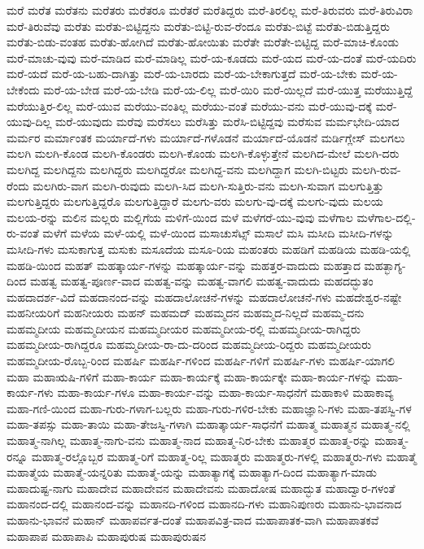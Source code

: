 {ಮರೆ
ಮರೆತ
ಮರೆತನು
ಮರೆತರು
ಮರೆತರೂ
ಮರೆತರೆ
ಮರೆತಿದ್ದರು
ಮರೆ-ತಿರಲಿಲ್ಲ
ಮರೆ-ತಿರುವರು
ಮರೆ-ತಿರುವಿರಾ
ಮರೆ-ತಿರುವೆವು
ಮರೆತು
ಮರೆತು-ಬಿಟ್ಟಿದ್ದನು
ಮರೆತು-ಬಿಟ್ಟಿ-ರುವ-ರೆಂದೂ
ಮರೆತು-ಬಿಟ್ಟೆ
ಮರೆತು-ಬಿಡುತ್ತಿದ್ದರು
ಮರೆತು-ಬಿಡು-ವಂತಹ
ಮರೆತು-ಹೋಗಿದೆ
ಮರೆತು-ಹೋಯಿತು
ಮರೆತೇ
ಮರೆತೇ-ಬಿಟ್ಟಿದ್ದ
ಮರೆ-ಮಾಚಿ-ಕೊಂಡು
ಮರೆ-ಮಾಚು-ವುವು
ಮರೆ-ಮಾಡಿದ
ಮರೆ-ಮಾಡಿಲ್ಲ
ಮರೆ-ಯ-ಕೂಡದು
ಮರೆ-ಯದ
ಮರೆ-ಯ-ದಂತೆ
ಮರೆ-ಯದಿರು
ಮರೆ-ಯದೆ
ಮರೆ-ಯ-ಬಹು-ದಾಗಿತ್ತು
ಮರೆ-ಯ-ಬಾರದು
ಮರೆ-ಯ-ಬೇಕಾಗುತ್ತದೆ
ಮರೆ-ಯ-ಬೇಕು
ಮರೆ-ಯ-ಬೇಕೆಂದು
ಮರೆ-ಯ-ಬೇಡ
ಮರೆ-ಯ-ಬೇಡಿ
ಮರೆ-ಯ-ಲಿಲ್ಲ
ಮರೆ-ಯಿರಿ
ಮರೆ-ಯಿಲ್ಲದೆ
ಮರೆ-ಯುತ್ತ
ಮರೆಯುತ್ತಿದ್ದೆ
ಮರೆಯುತ್ತಿರ-ಲಿಲ್ಲ
ಮರೆ-ಯುವ
ಮರೆಯು-ವಂತಿಲ್ಲ
ಮರೆಯು-ವಂತೆ
ಮರೆಯು-ವನು
ಮರೆ-ಯುವು-ದಕ್ಕೆ
ಮರೆ-ಯುವು-ದಿಲ್ಲ
ಮರೆ-ಯುವುದು
ಮರೆವು
ಮರೆಸಲು
ಮರೆಸಿತ್ತು
ಮರೆಸಿ-ಬಿಟ್ಟಿದ್ದವು
ಮರೆಸುವ
ಮರ್ಮಭೇದಿ-ಯಾದ
ಮರ್ಮರ
ಮರ್ಮಾಂತಕ
ಮರ್ಯಾದೆ-ಗಳು
ಮರ್ಯಾದೆ-ಗಳೊಡನೆ
ಮರ್ಯಾದೆ-ಯೊಡನೆ
ಮರ್ಡಿಗ್ಲೇಸ್
ಮಲಗಲು
ಮಲಗಿ
ಮಲಗಿ-ಕೊಂಡ
ಮಲಗಿ-ಕೊಂಡರು
ಮಲಗಿ-ಕೊಂಡು
ಮಲಗಿ-ಕೊಳ್ಳುತ್ತೇನೆ
ಮಲಗಿದ-ಮೇಲೆ
ಮಲಗಿ-ದರು
ಮಲಗಿದ್ದ
ಮಲಗಿದ್ದನು
ಮಲಗಿದ್ದರು
ಮಲಗಿದ್ದರೋ
ಮಲಗಿದ್ದ-ವನು
ಮಲಗಿದ್ದಾಗ
ಮಲಗಿ-ಬಿಟ್ಟರು
ಮಲಗಿ-ರುವ-ರೆಂದು
ಮಲಗಿರು-ವಾಗ
ಮಲಗಿ-ರುವುದು
ಮಲಗಿ-ಸಿದ
ಮಲಗಿ-ಸುತ್ತಿರು-ವನು
ಮಲಗಿ-ಸುವಾಗ
ಮಲಗುತ್ತಿತ್ತು
ಮಲಗುತ್ತಿದ್ದರು
ಮಲಗುತ್ತಿದ್ದರೊ
ಮಲಗುತ್ತಿದ್ದಾರೆ
ಮಲಗು-ವರು
ಮಲಗು-ವು-ದಕ್ಕೆ
ಮಲಗು-ವುದು
ಮಲಯ
ಮಲಯ-ರನ್ನು
ಮಲಿನ
ಮಲ್ಲರು
ಮಲ್ಲಿಗೆಯ
ಮಳಿಗೆ-ಯಿಂದ
ಮಳೆ
ಮಳೆಗರೆ-ಯು-ವುವು
ಮಳೆಗಾಲ
ಮಳೆಗಾಲ-ದಲ್ಲಿ-ರು-ವಂತೆ
ಮಳೆಗೆ
ಮಳೆಯ
ಮಳೆ-ಯಲ್ಲಿ
ಮಳೆ-ಯಿಂದ
ಮಸಾಚುಸೆಟ್ಸ್
ಮಸಾಲೆ
ಮಸಿ
ಮಸೀದಿ
ಮಸೀದಿ-ಗಳನ್ನು
ಮಸೀದಿ-ಗಳು
ಮಸುಕಾಗುತ್ತ
ಮಸುಕು
ಮಸೂದೆಯ
ಮಸೂ-ರಿಯ
ಮಹಂತರು
ಮಹಡಿಗೆ
ಮಹಡಿಯ
ಮಹಡಿ-ಯಲ್ಲಿ
ಮಹಡಿ-ಯಿಂದ
ಮಹತ್
ಮಹತ್ಕಾರ್ಯ-ಗಳನ್ನು
ಮಹತ್ಕಾರ್ಯ-ವನ್ನು
ಮಹತ್ತರ-ವಾದುದು
ಮಹತ್ತಾದ
ಮಹತ್ಭಾಗ್ಯ-ದಿಂದ
ಮಹತ್ವ
ಮಹತ್ವ-ಪೂರ್ಣ-ವಾದ
ಮಹತ್ವ-ವನ್ನು
ಮಹತ್ವ-ವಾಗಲಿ
ಮಹತ್ವ-ವಾದುದು
ಮಹದದ್ಭುತಂ
ಮಹದಾದರ್ಶ-ವಿದೆ
ಮಹದಾನಂದ-ವನ್ನು
ಮಹದಾಲೋಚನೆ-ಗಳನ್ನು
ಮಹದಾಲೋಚನೆ-ಗಳು
ಮಹದೇಶ್ವರ-ನಷ್ಟೇ
ಮಹನೀಯರಿಗೆ
ಮಹನೀಯರು
ಮಹನ್
ಮಹಮದ್
ಮಹಮ್ಮದನ
ಮಹಮ್ಮದ-ನಿಲ್ಲದೆ
ಮಹಮ್ಮ-ದನು
ಮಹಮ್ಮದೀಯ
ಮಹಮ್ಮದೀಯನ
ಮಹಮ್ಮದೀಯರ
ಮಹಮ್ಮದೀಯ-ರಲ್ಲಿ
ಮಹಮ್ಮದೀಯ-ರಾಗಿದ್ದರು
ಮಹಮ್ಮದೀಯ-ರಾಗಿದ್ದರೂ
ಮಹಮ್ಮದೀಯ-ರಾ-ದು-ದರಿಂದ
ಮಹಮ್ಮದೀಯ-ರಿದ್ದರು
ಮಹಮ್ಮದೀಯರು
ಮಹಮ್ಮದೀಯ-ರೊಬ್ಬ-ರಿಂದ
ಮಹರ್ಷಿ
ಮಹರ್ಷಿ-ಗಳಿಂದ
ಮಹರ್ಷಿ-ಗಳಿಗೆ
ಮಹರ್ಷಿ-ಗಳು
ಮಹರ್ಷಿ-ಯಾಗಲಿ
ಮಹಾ
ಮಹಾಋಷಿ-ಗಳಿಗೆ
ಮಹಾ-ಕಾರ್ಯ
ಮಹಾ-ಕಾರ್ಯಕ್ಕೆ
ಮಹಾ-ಕಾರ್ಯಕ್ಕೇ
ಮಹಾ-ಕಾರ್ಯ-ಗಳನ್ನು
ಮಹಾ-ಕಾರ್ಯ-ಗಳು
ಮಹಾ-ಕಾರ್ಯ-ಗಳೂ
ಮಹಾ-ಕಾರ್ಯ-ವನ್ನು
ಮಹಾ-ಕಾರ್ಯ-ಸಾಧನೆಗೆ
ಮಹಾಕಾಳಿ
ಮಹಾಕಾವ್ಯ
ಮಹಾ-ಗಣಿ-ಯಿಂದ
ಮಹಾ-ಗುರು-ಗಳಾಗ-ಬಲ್ಲರು
ಮಹಾ-ಗುರು-ಗಳಿರ-ಬೇಕು
ಮಹಾಜ್ಞಾನಿ-ಗಳು
ಮಹಾ-ತಪಸ್ವಿ-ಗಳ
ಮಹಾ-ತಪಸ್ಸು
ಮಹಾ-ತಾಯಿ
ಮಹಾ-ತೇಜಸ್ವಿ-ಗಳಾಗಿ
ಮಹಾತ್ಕಾರ್ಯ-ಸಾಧನೆಗೆ
ಮಹಾತ್ಮ
ಮಹಾತ್ಮನ
ಮಹಾತ್ಮ-ನಲ್ಲಿ
ಮಹಾತ್ಮ-ನಾಗಿಲ್ಲ
ಮಹಾತ್ಮ-ನಾಗು-ವನು
ಮಹಾತ್ಮ-ನಾದ
ಮಹಾತ್ಮ-ನಿರ-ಬೇಕು
ಮಹಾತ್ಮರ
ಮಹಾತ್ಮ-ರನ್ನು
ಮಹಾತ್ಮ-ರನ್ನೂ
ಮಹಾತ್ಮ-ರಲ್ಲೊಬ್ಬರ
ಮಹಾತ್ಮ-ರಿಗೆ
ಮಹಾತ್ಮ-ರಿಲ್ಲ
ಮಹಾತ್ಮರು
ಮಹಾತ್ಮರು-ಗಳಲ್ಲಿ
ಮಹಾತ್ಮರು-ಗಳು
ಮಹಾತ್ಮೆ
ಮಹಾತ್ಮೆಯ
ಮಹಾತ್ಮೆ-ಯನ್ನರಿತು
ಮಹಾತ್ಮೆ-ಯನ್ನು
ಮಹಾತ್ಯಾಗಕ್ಕೆ
ಮಹಾತ್ಯಾಗ-ದಿಂದ
ಮಹಾತ್ಯಾಗ-ಮಾಡು
ಮಹಾದುಷ್ಟ-ನಾಗು
ಮಹಾದೇವ
ಮಹಾದೇವನ
ಮಹಾದೇವನು
ಮಹಾದೋಷ
ಮಹಾದ್ಭುತ
ಮಹಾದ್ವಾರ-ಗಳಂತೆ
ಮಹಾನಂದ-ದಲ್ಲಿ
ಮಹಾನಂದ-ವನ್ನು
ಮಹಾನದಿ-ಗಳಿಂದ
ಮಹಾನದಿ-ಗಳು
ಮಹಾನಿಪುಣರು
ಮಹಾನು-ಭಾವನಾದ
ಮಹಾನು-ಭಾವನೆ
ಮಹಾನ್
ಮಹಾಪರ್ವತ-ದಂತೆ
ಮಹಾಪವಿತ್ರ-ವಾದ
ಮಹಾಪಾತಕ-ವಾಗಿ
ಮಹಾಪಾತಕವೆ
ಮಹಾಪಾಪ
ಮಹಾಪಾಪಿ
ಮಹಾಪುರುಷ
ಮಹಾಪುರುಷನ
}
